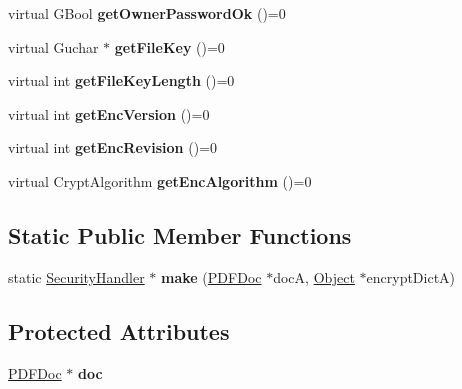 \begin{DoxyCompactItemize}
virtual G\+Bool {\bfseries get\+Owner\+Password\+Ok} ()=0
\item 
\mbox{\label{class_security_handler_af06c5f55e333223899865c423f5b7d17}} 
virtual Guchar $\ast$ {\bfseries get\+File\+Key} ()=0
\item 
\mbox{\label{class_security_handler_aa5244886f9c0fce0deff8214959da9b9}} 
virtual int {\bfseries get\+File\+Key\+Length} ()=0
\item 
\mbox{\label{class_security_handler_af7857f53485d4a1922f90b6d2862728c}} 
virtual int {\bfseries get\+Enc\+Version} ()=0
\item 
\mbox{\label{class_security_handler_aabfd228c2ae1fecac07ebc7fa7299286}} 
virtual int {\bfseries get\+Enc\+Revision} ()=0
\item 
\mbox{\label{class_security_handler_a6267228dd65216b987d0a50a187730b7}} 
virtual Crypt\+Algorithm {\bfseries get\+Enc\+Algorithm} ()=0
\end{DoxyCompactItemize}
\subsection*{Static Public Member Functions}
\begin{DoxyCompactItemize}
\item 
\mbox{\label{class_security_handler_a693aabf457f9fa5d73de9063a37e6533}} 
static \hyperlink{class_security_handler}{Security\+Handler} $\ast$ {\bfseries make} (\hyperlink{class_p_d_f_doc}{P\+D\+F\+Doc} $\ast$docA, \hyperlink{class_object}{Object} $\ast$encrypt\+DictA)
\end{DoxyCompactItemize}
\subsection*{Protected Attributes}
\begin{DoxyCompactItemize}
\item 
\mbox{\label{class_security_handler_a54b3d72ab0be713cbba65e9869a00941}} 
\hyperlink{class_p_d_f_doc}{P\+D\+F\+Doc} $\ast$ {\bfseries doc}
\end{DoxyCompactItemize}



